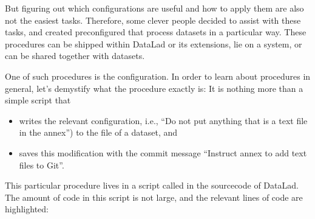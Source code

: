 \sphinxAtStartPar
But figuring out which configurations are useful and how
to apply them are also not the easiest tasks. Therefore,
some clever people decided to assist with
these tasks, and created pre\sphinxhyphen{}configured 
that process datasets in a particular way.
These procedures can be shipped within DataLad or its extensions,
lie on a system, or can be shared together with datasets.

\sphinxAtStartPar
One of such procedures is the  configuration.
In order to learn about procedures in general, let’s demystify
what the  procedure exactly is: It is
nothing more than a simple script that
\begin{itemize}
\item {} 
\sphinxAtStartPar
writes the relevant  configuration,  i.e., “Do not put anything that is a text file in the annex”) to the  file of a dataset, and

\item {} 
\sphinxAtStartPar
saves this modification with the commit message “Instruct annex to add text files to Git”.

\end{itemize}

\sphinxAtStartPar
This particular procedure lives in a script called
 in the sourcecode of DataLad. The amount of code
in this script is not large, and the relevant lines of code
are highlighted:

